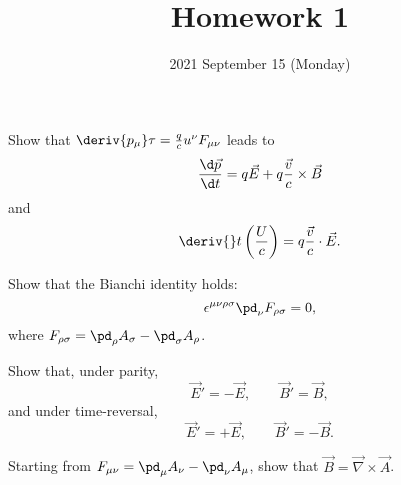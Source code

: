 \documentclass{phys151}
\title{Homework 1}
\date{2021 September 15 (Monday)}
\author{}
\begin{document}
\begin{problem}
  Show that \(\deriv {p_\mu} \tau = \frac q c u^\nu F_{\mu \nu}\) leads to
  \[
    \frac{\d \vec p}{\d t} = q \vec E + q \frac {\vec v} c \times \vec B
  \]
  and
  \[
    \deriv {} t \left(\frac U c\right) = q \frac {\vec v} c \cdot \vec E.
  \]
\end{problem}

\begin{solution}

\end{solution}

\begin{problem}
  Show that the Bianchi identity holds:
  \[
    \epsilon^{\mu \nu \rho \sigma} \pd_\nu F_{\rho \sigma} = 0,
  \]
  where \(F_{\rho \sigma} = \pd_\rho A_\sigma - \pd_\sigma A_\rho\).
\end{problem}

\begin{solution}

\end{solution}

\begin{problem}
  Show that, under parity,
  \[
    \vec E' = -\vec E, \qquad \vec B' = \vec B,
  \]
  and under time-reversal,
  \[
    \vec E' = +\vec E, \qquad \vec B' = -\vec B.
  \]
\end{problem}

\begin{solution}

\end{solution}

\begin{problem}
  Starting from \(F_{\mu \nu} = \pd_\mu A_\nu - \pd_\nu A_\mu\), show that
  \(\vec B = \vec \nabla \times \vec A\).
\end{problem}

\begin{solution}

\end{solution}
\end{document}
